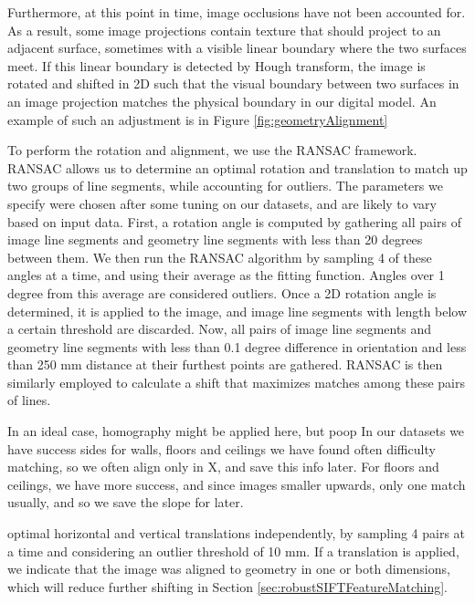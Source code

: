 \documentclass[]{spie}  %
\begin{document}
Furthermore, at this point in time, image occlusions have not been
accounted for. As a result, some image projections contain texture
that should project to an adjacent surface, sometimes with a visible
linear boundary where the two surfaces meet. If this linear boundary
is detected by Hough transform, the image is rotated and shifted in 2D
such that the visual boundary between two surfaces in an image
projection matches the physical boundary in our digital model. An
example of such an adjustment is in Figure \ref{fig:geometryAlignment}


To perform the rotation and alignment, we use the RANSAC
\cite{fischler1981random} framework. RANSAC allows us to determine an
optimal rotation and translation to match up two groups of line
segments, while accounting for outliers. The parameters we specify
were chosen after some tuning on our datasets, and are likely to vary
based on input data. First, a rotation angle is computed by gathering
all pairs of image line segments and geometry line segments with less
than 20 degrees between them. We then run the RANSAC algorithm by
sampling 4 of these angles at a time, and using their average as the
fitting function. Angles over 1 degree from this average are
considered outliers. Once a 2D rotation angle is determined, it is
applied to the image, and image line segments with length below a
certain threshold are discarded. Now, all pairs of image line segments
and geometry line segments with less than 0.1 degree difference in
orientation and less than 250 mm distance at their furthest points are
gathered. RANSAC is then similarly employed to calculate a shift that maximizes matches among these pairs of lines. 

In an ideal case, homography might be applied here, but poop
In our datasets we have success sides for walls, floors and ceilings we have found often difficulty matching, so we often align only in X, and save this info later.
For floors and ceilings, we have more success, and since images smaller upwards, only one match usually, and so we save the slope for later.


optimal
horizontal and vertical translations independently, by sampling 4
pairs at a time and considering an outlier threshold of 10 mm. If a
translation is applied, we indicate that the image was aligned to
geometry in one or both dimensions, which will reduce further shifting
in Section \ref{sec:robustSIFTFeatureMatching}.
\end{document}
